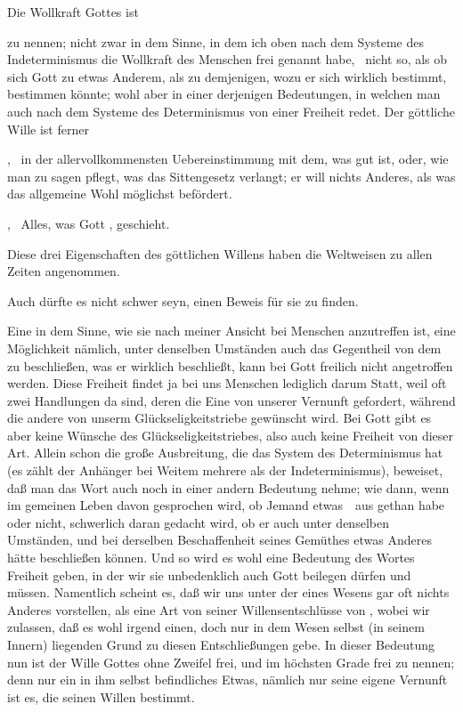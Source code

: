\begin{aufza}
\item Die Wollkraft Gottes ist
\begin{aufzb} 
\item {} zu nennen; nicht zwar in dem Sinne, in dem ich oben nach dem Systeme des Indeterminismus die Wollkraft des Menschen frei genannt habe, \dh\ nicht so, als ob sich Gott zu etwas Anderem, als zu demjenigen, wozu er sich wirklich bestimmt, bestimmen könnte; wohl aber in einer derjenigen Bedeutungen, in welchen man auch nach dem Systeme des Determinismus von einer Freiheit redet. Der göttliche Wille ist ferner
\item {}, \dh\ in der allervollkommensten Uebereinstimmung mit dem, was gut ist, oder, wie man zu sagen pflegt, was das Sittengesetz verlangt; er will nichts Anderes, als was das allgemeine Wohl möglichst befördert.
\item {}, \dh\ Alles, was Gott , geschieht.
\end{aufzb}
\item Diese drei Eigenschaften des göttlichen Willens haben die Weltweisen zu allen Zeiten angenommen.
\item Auch dürfte es nicht schwer seyn, einen Beweis für sie zu finden.
\begin{aufzb}
\item Eine  in dem Sinne, wie sie nach meiner Ansicht bei Menschen anzutreffen ist, eine Möglichkeit nämlich, unter denselben Umständen auch das Gegentheil von dem zu beschließen, was er wirklich beschließt, kann bei Gott freilich nicht angetroffen werden. Diese Freiheit findet ja bei uns Menschen lediglich darum Statt, weil oft zwei Handlungen da sind, deren die Eine von unserer Vernunft gefordert, während die andere von unserm Glückseligkeitstriebe gewünscht wird. Bei Gott gibt es aber keine Wünsche des Glückseligkeitstriebes, also auch keine Freiheit von dieser Art. Allein schon die große Ausbreitung, die das System des Determinismus hat (es zählt der Anhänger bei Weitem mehrere als der Indeterminismus), beweiset, daß man das Wort  auch noch in einer andern Bedeutung nehme; wie dann, wenn im gemeinen Leben davon gesprochen wird, ob Jemand etwas~\ aus  gethan habe oder nicht, schwerlich daran gedacht wird, ob er auch unter denselben Umständen, und bei derselben Beschaffenheit seines Gemüthes etwas Anderes hätte beschließen können. Und so wird es wohl eine Bedeutung des Wortes Freiheit geben, in der wir sie unbedenklich auch Gott beilegen dürfen und müssen. Namentlich scheint es, daß wir uns unter der  eines Wesens gar oft nichts Anderes vorstellen, als eine Art von  seiner Willensentschlüsse von , wobei wir zulassen, daß es wohl irgend einen, doch nur in dem Wesen selbst (in seinem Innern) liegenden Grund zu diesen Entschließungen gebe. In dieser Bedeutung nun ist der Wille Gottes ohne Zweifel frei, und im höchsten Grade frei zu nennen; denn nur ein in ihm selbst befindliches Etwas, nämlich nur seine eigene Vernunft ist es, die seinen Willen bestimmt.

\end{aufzb}
\end{aufza}
